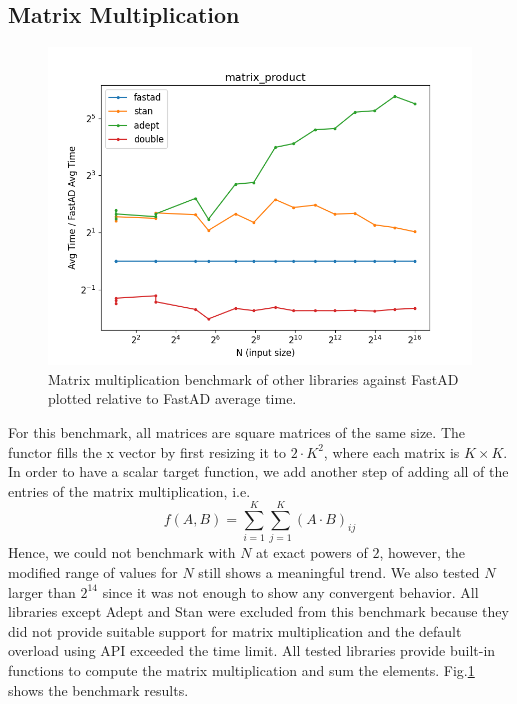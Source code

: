 \subsection{Matrix Multiplication}\label{ssec:matrix_mult}

\begin{figure}[t]
    \centering
    \includegraphics[width=\textwidth]{figs/matrix_product_fig.png}
    \caption{%
        Matrix multiplication benchmark of other libraries against FastAD 
        plotted relative to FastAD average time.
    }\label{fig:matrix_mult}
\end{figure}

For this benchmark, all matrices are square matrices of the same size.
The functor fills the x vector by first resizing it to $2 \cdot K^2$,
where each matrix is $K\times K$.
In order to have a scalar target function,
we add another step of adding all of the entries of the matrix multiplication, i.e.
\[
    f(A, B) = \sum\limits_{i=1}^{K} \sum\limits_{j=1}^{K} {(A \cdot B)}_{ij}
\]
Hence, we could not benchmark with $N$ at exact powers of $ 2$,
however, the modified range of values for $N$ still shows a meaningful trend.
We also tested $N$ larger than $2^{14}$ since it was not enough to show any convergent behavior.
All libraries except Adept and Stan were excluded from this benchmark
because they did not provide suitable support for matrix multiplication
and the default overload using  API exceeded the time limit.
All tested libraries provide built-in functions to 
compute the matrix multiplication and sum the elements.
Fig.\ref{fig:matrix_mult} shows the benchmark results.

